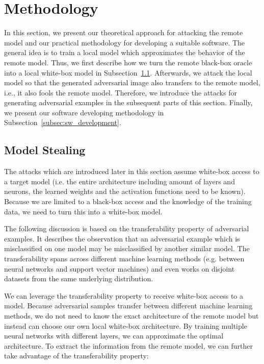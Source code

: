 
\section{Methodology}\label{sec:methodology}

In this section, we present our theoretical approach for attacking the remote model and our practical methodology for developing a suitable software.
The general idea is to train a local model which approximates the behavior of the remote model.
Thus, we first describe how we turn the remote black-box oracle into a local white-box model in Subsection~\ref{subsec:modelstealing}.
Afterwards, we attack the local model so that the generated adversarial image also transfers to the remote model, i.e., it also fools the remote model.
Therefore, we introduce the attacks for generating adversarial examples in the subsequent parts of this section.
Finally, we present our software developing methodology in Subsection~\ref{subsec:sw_development}.

\subsection{Model Stealing}\label{subsec:modelstealing}

The attacks which are introduced later in this section assume white-box access to a target model (i.e. the entire architecture including amount of layers and neurons, the learned weights and the activation functions need to be known).
Because we are limited to a black-box access and the knowledge of the training data, we need to turn this into a white-box model.

The following discussion is based on the transferability property of adversarial examples.
It describes the observation that an adversarial example which is misclassified on one model may be misclassified by another similar model.
The transferability spans across different machine learning methods (e.g. between neural networks and support vector machines) and even works on disjoint datasets from the same underlying distribution. \cite{papernot2016transferability,goodfellow6572explaining, szegedy2013intriguing}

We can leverage the transferability property to receive white-box access to a model.
Because adversarial samples transfer between different machine learning methods, we do not need to know the exact architecture of the remote model but instead can choose our own local white-box architecture.
By training multiple neural networks with different layers, we can approximate the optimal architecture.
To extract the information from the remote model, we can further take advantage of the transferability property:

